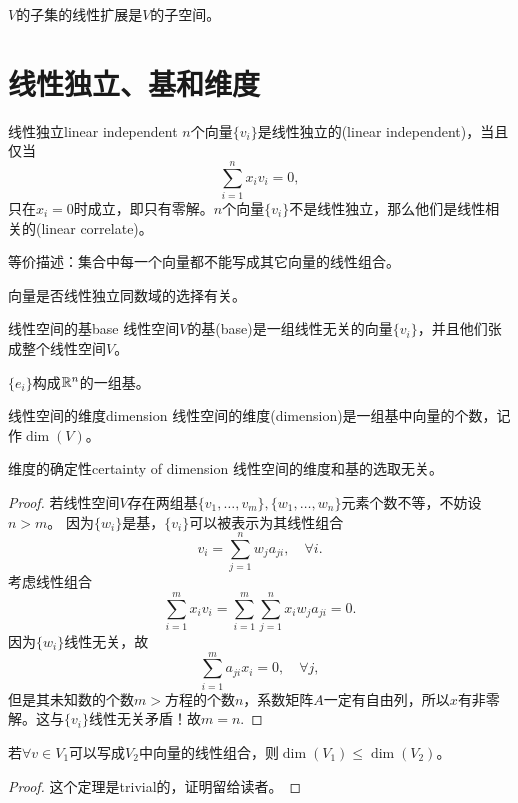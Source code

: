 \begin{corollary}
	$V$的子集的线性扩展是$V$的子空间。
\end{corollary}

\section{线性独立、基和维度}
\begin{definition}{线性独立}{linear independent}
	$n$个向量$\{v_i\}$是线性独立的(linear independent)，当且仅当
	\[
		\sum_{i=1}^nx_iv_i=0,
	\]
	只在$x_i=0$时成立，即只有零解。$n$个向量$\{v_i\}$不是线性独立，那么他们是线性相关的(linear correlate)。
	
	等价描述：集合中每一个向量都不能写成其它向量的线性组合。
\end{definition}
\begin{remark}
	向量是否线性独立同数域的选择有关。
\end{remark}
\begin{definition}{线性空间的基}{base}
	线性空间$V$的基(base)是一组线性无关的向量$\{v_i\}$，并且他们张成整个线性空间$V$。
\end{definition}
\begin{example}
	{}{}
	$\{e_i\}$构成$\mathbb R^n$的一组基。
\end{example}
\begin{definition}{线性空间的维度}{dimension}
	线性空间的维度(dimension)是一组基中向量的个数，记作$\dim(V)$。
\end{definition}
\begin{theorem}{维度的确定性}{certainty of dimension}
	线性空间的维度和基的选取无关。
\end{theorem}
\begin{proof}
	若线性空间$V$存在两组基$\{v_1,\ldots,v_m\},\{w_1,\ldots,w_n\}$元素个数不等，不妨设$n>m$。
	因为$\{w_i\}$是基，$\{v_i\}$可以被表示为其线性组合
	\[
		v_i=\sum_{j=1}^nw_ja_{ji},\quad\forall i.
	\]
	考虑线性组合
	\[
		\sum_{i=1}^mx_iv_i=\sum_{i=1}^m\sum_{j=1}^nx_iw_ja_{ji}=0.
	\]
	因为$\{w_i\}$线性无关，故
	\[
		\sum_{i=1}^ma_{ji}x_i=0,\quad\forall j,
	\]
	但是其未知数的个数$m>$方程的个数$n$，系数矩阵$A$一定有自由列，所以$x$有非零解。这与$\{v_i\}$线性无关矛盾！故$m=n.$
\end{proof}

\begin{theorem}{}{}
	若$\forall v\in V_1$可以写成$V_2$中向量的线性组合，则$\dim(V_1)\leqslant\dim(V_2)$。
\end{theorem}

\begin{proof}
	这个定理是trivial的，证明留给读者。
\end{proof}

